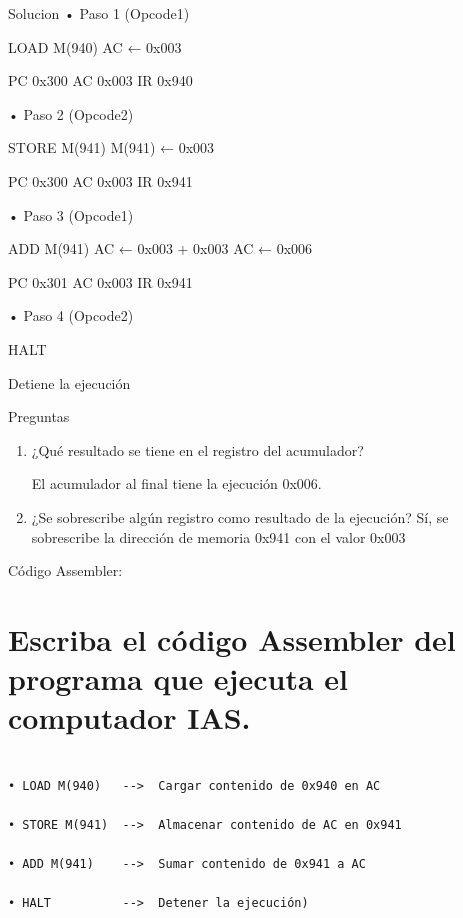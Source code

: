 \documentclass{article}
\begin{document}
\begin{frame}[label={sec:org8581f17}]{Solucion}
• Paso 1 (Opcode1)

LOAD M(940)
AC ← 0x003

\alert{PC} 0x300
\alert{AC} 0x003
\alert{IR} 0x940

• Paso 2 (Opcode2)

STORE M(941)
M(941) ← 0x003

\alert{PC} 0x300
\alert{AC} 0x003
\alert{IR} 0x941

• Paso 3 (Opcode1)

ADD M(941)
AC ← 0x003 + 0x003
AC ← 0x006

\alert{PC} 0x301
\alert{AC} 0x003
\alert{IR} 0x941

• Paso 4 (Opcode2)

HALT

\alert{Detiene la ejecución}
\end{frame}

\begin{frame}[label={sec:orgbd47b58}]{Preguntas}
\begin{enumerate}
\item ¿Qué resultado se tiene en el registro del acumulador?

El acumulador al final tiene la ejecución  0x006.

\item ¿Se sobrescribe algún registro como resultado de la ejecución?
Sí, se sobrescribe la dirección de memoria 0x941 con el valor 0x003
\end{enumerate}
\end{frame}

\begin{frame}[label={sec:org6305171}]{Código Assembler:}
\end{frame}

\section{Escriba el código Assembler del programa que ejecuta el computador IAS.}
\label{sec:orgbd47ef9}


\begin{verbatim}

• LOAD M(940)   -->  Cargar contenido de 0x940 en AC

• STORE M(941)  -->  Almacenar contenido de AC en 0x941

• ADD M(941)    -->  Sumar contenido de 0x941 a AC

• HALT          -->  Detener la ejecución)

\end{verbatim}
\end{document}
